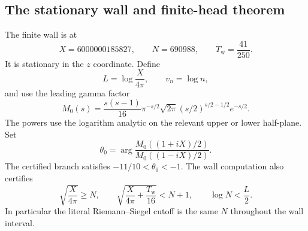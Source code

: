 \documentclass[11pt,a4paper]{article}
\theoremstyle{definition}
\theoremstyle{remark}
\begin{document}
\subsection{The stationary wall and finite-head theorem}
\label{fnd:finitewall}

The finite wall is at
\begin{equation}
 X=6000000185827,\qquad N=690988,\qquad T_{\mathrm w}=\frac{41}{250}.
 \label{fnd:wallparameters}
\end{equation}
It is stationary in the $z$ coordinate. Define
\[
 L=\log\frac{X}{4\pi},\qquad v_n=\log n,
\]
and use the leading gamma factor
\begin{equation}
 M_0(s)=\frac{s(s-1)}{16}\pi^{-s/2}\sqrt{2\pi}
            (s/2)^{s/2-1/2}e^{-s/2}.
 \label{fnd:Mzero}
\end{equation}
The powers use the logarithm analytic on the relevant upper or lower
half-plane. Set
\[
 \theta_0=\arg\frac{M_0((1+iX)/2)}{M_0((1-iX)/2)}.
\]
The certified branch satisfies $-11/10<\theta_0<-1$. The wall computation
also certifies
\begin{equation}
 \sqrt{\frac{X}{4\pi}}\geq N,\qquad
 \sqrt{\frac{X}{4\pi}+\frac{T_{\mathrm w}}{16}}<N+1,
 \qquad \log N<\frac L2.
 \label{fnd:cutoff}
\end{equation}
In particular the literal Riemann--Siegel cutoff is the same $N$ throughout
the wall interval.
\end{document}
